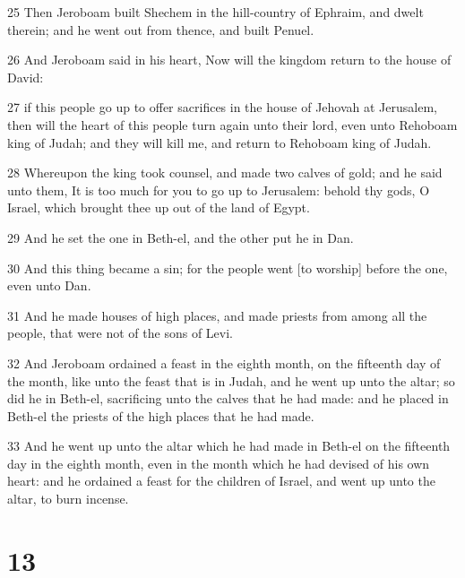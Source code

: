 \par 25 Then Jeroboam built Shechem in the hill-country of Ephraim, and dwelt therein; and he went out from thence, and built Penuel.
\par 26 And Jeroboam said in his heart, Now will the kingdom return to the house of David:
\par 27 if this people go up to offer sacrifices in the house of Jehovah at Jerusalem, then will the heart of this people turn again unto their lord, even unto Rehoboam king of Judah; and they will kill me, and return to Rehoboam king of Judah.
\par 28 Whereupon the king took counsel, and made two calves of gold; and he said unto them, It is too much for you to go up to Jerusalem: behold thy gods, O Israel, which brought thee up out of the land of Egypt.
\par 29 And he set the one in Beth-el, and the other put he in Dan.
\par 30 And this thing became a sin; for the people went [to worship] before the one, even unto Dan.
\par 31 And he made houses of high places, and made priests from among all the people, that were not of the sons of Levi.
\par 32 And Jeroboam ordained a feast in the eighth month, on the fifteenth day of the month, like unto the feast that is in Judah, and he went up unto the altar; so did he in Beth-el, sacrificing unto the calves that he had made: and he placed in Beth-el the priests of the high places that he had made.
\par 33 And he went up unto the altar which he had made in Beth-el on the fifteenth day in the eighth month, even in the month which he had devised of his own heart: and he ordained a feast for the children of Israel, and went up unto the altar, to burn incense.

\chapter{13}

